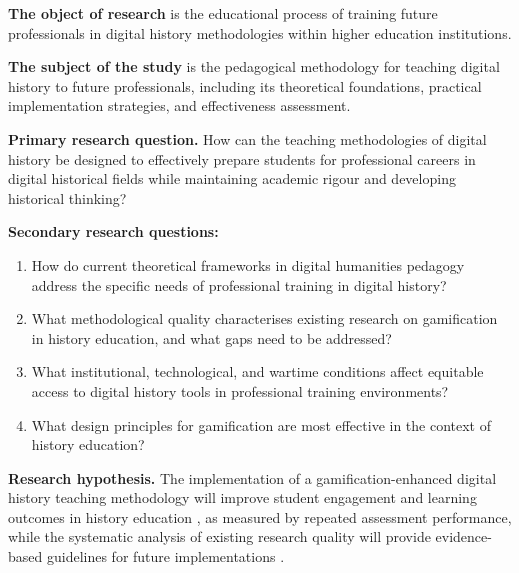 {\textbf{The object of research} is the educational process of training future professionals in digital history methodologies within higher education institutions.

\textbf{The subject of the study} is the pedagogical methodology for teaching digital history to future professionals, including its theoretical foundations, practical implementation strategies, and effectiveness assessment.

\textbf{Primary research question.} How can the teaching methodologies of digital history be designed to effectively prepare students for professional careers in digital historical fields while maintaining academic rigour and developing historical thinking?

\textbf{Secondary research questions:}
\begin{enumerate}
  \item How do current theoretical frameworks in digital humanities pedagogy address the specific needs of professional training in digital history?
  \item What methodological quality characterises existing research on gamification in history education, and what gaps need to be addressed? \cite{Korniienko2025mrqs}
  \item What institutional, technological, and wartime conditions affect equitable access to digital history tools in professional training environments?
  \item What design principles for gamification are most effective in the context of history education? \cite{Deterding2011, KorniienkoSemerikov2024}
\end{enumerate}

\textbf{Research hypothesis.} The implementation of a gamification-enhanced digital history teaching methodology will improve student engagement and learning outcomes in history education \cite{Hamari2014, Sailer2017}, as measured by repeated assessment performance, while the systematic analysis of existing research quality will provide evidence-based guidelines for future implementations \cite{Page2021, Korniienko2025mrqs}.

}
